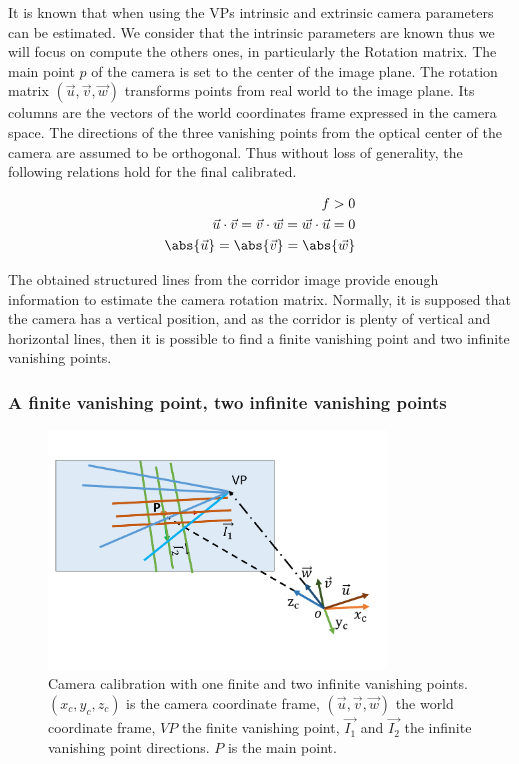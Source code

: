 It is known that when using the VPs intrinsic and extrinsic camera parameters can be estimated. We consider that the intrinsic parameters are known thus we will focus on compute the others ones, in particularly the Rotation matrix.
The main point $p$ of the camera is set to the center of the image plane. The rotation matrix
$(\vec{u},\vec{v},\vec{w})$ transforms points from real world to the image plane. Its columns are the vectors of the world coordinates frame expressed in the camera space. The directions of the three vanishing points from the optical center of the camera are assumed to be orthogonal. Thus without loss of generality, the following relations hold for the final calibrated.

\begin{subequations}
\begin{align}
	\label{VectorOrto}
	f>0 \\
	\vec{u} \cdot \vec{v}= \vec{v}\cdot \vec{w}=\vec{w}\cdot \vec{u}=0\\
  	\abs{\vec{u}}=\abs{\vec{v}}=\abs{\vec{w}}
\end{align}
\end{subequations}

The obtained structured lines  from the corridor image provide enough information to estimate the camera rotation matrix.
Normally, it is supposed that the camera has a vertical position, and  as the corridor is plenty of vertical and horizontal lines, then it is possible to find a finite vanishing point and two infinite vanishing points.


\subsubsection*{A finite vanishing point, two infinite vanishing points}

\begin{figure}[h!]
\centering
\includegraphics[width=0.8\textwidth]{Chapter03/Images/twoInfiniteVPOneFVPG.pdf}
\caption{Camera calibration with one finite and two infinite vanishing points. $(x_c,y_c,z_c)$ is the camera coordinate frame, $(\vec{u},\vec{v},\vec{w})$ the world coordinate frame, $VP$ the finite vanishing point, $\vec{I_1}$ and $\vec{I_2}$ the infinite vanishing point directions. $P$ is the main point.}
\label{fig:3_unpunto}
\end{figure}

